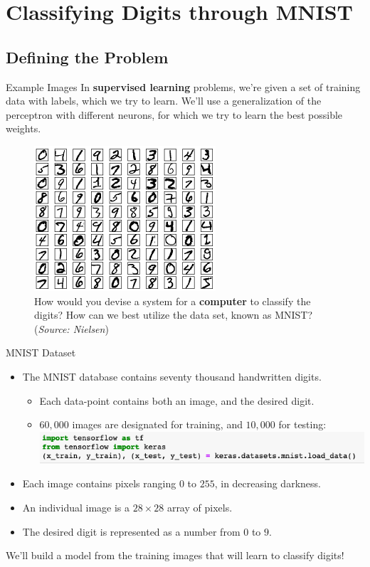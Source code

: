 \documentclass[xcolor=dvipsnames, fontsize=11pt, %
pagesize, %
parskip=half-, t]{beamer}
\begin{document}
\section{Classifying Digits through MNIST}
\subsection{Defining the Problem}
\begin{frame}[c]{Example Images}
In \textbf{supervised learning} problems, we're given a set of training data with labels, which we try to learn. We'll use a generalization of the perceptron with different neurons, for which we try to learn the best possible weights. \pause 
\begin{figure} 
\center
\includegraphics{mnist_100_digits.png}
\caption{How would you devise a system for a \textbf{computer} to classify the digits? How can we best utilize the data set, known as MNIST?  (\textit{Source: Nielsen}) }
\end{figure}
\end{frame}

\begin{frame}[c]{MNIST Dataset}
\begin{itemize}
\item The MNIST database contains seventy thousand handwritten digits.  \pause 
\begin{itemize}
\item Each data-point contains both an image, and the desired digit.
\item $60,000$ images are designated for training, and $10,000$ for testing:
\includegraphics[scale=0.42]{load.png}
\end{itemize} \pause 
\item Each image contains pixels ranging $0$ to $255$, in decreasing darkness. \pause
\item  An individual image is a $28\times 28$ array of pixels.\pause  
\item The desired digit is represented as a number from $0$ to $9$. \pause 
\end{itemize}
We'll build a model from the training images that will learn to classify digits!
\end{frame}
\end{document}
